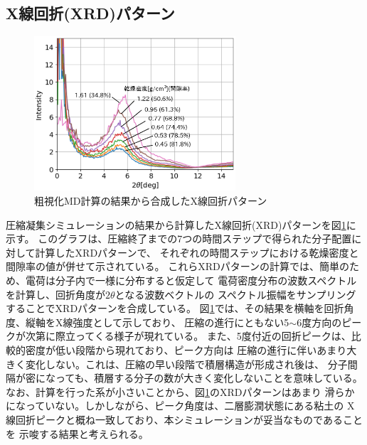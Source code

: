 ﻿\documentclass[11pt,a4j]{jarticle}
\begin{document}
\subsection{X線回折(XRD)パターン}
\begin{figure}
	\centering
	\includegraphics[keepaspectratio,width=75mm]{Figs/xrd.eps}
	\caption{粗視化MD計算の結果から合成したX線回折パターン}
	\label{fig:fig3}
\end{figure}
圧縮凝集シミュレーションの結果から計算したX線回折(XRD)パターンを図\ref{fig:fig3}に示す。
このグラフは、圧縮終了までの7つの時間ステップで得られた分子配置に対して計算したXRDパターンで、
それぞれの時間ステップにおける乾燥密度と間隙率の値が併せて示されている。
これらXRDパターンの計算では、簡単のため、電荷は分子内で一様に分布すると仮定して
電荷密度分布の波数スペクトルを計算し、回折角度が$2\theta$となる波数ベクトルの
スペクトル振幅をサンプリングすることでXRDパターンを合成している。
図\ref{fig:fig3}では、その結果を横軸を回折角度、縦軸をX線強度として示しており、
圧縮の進行にともない5$\sim$6度方向のピークが次第に際立ってくる様子が現れている。
また、5度付近の回折ピークは、比較的密度が低い段階から現れており、ピーク方向は
圧縮の進行に伴いあまり大きく変化しない。これは、圧縮の早い段階で積層構造が形成され後は、
分子間隔が密になっても、積層する分子の数が大きく変化しないことを意味している。
なお、計算を行った系が小さいことから、図\ref{fig:fig3}のXRDパターンはあまり
滑らかになっていない。しかしながら、ピーク角度は、二層膨潤状態にある粘土の
X線回折ピークと概ね一致しており、本シミュレーションが妥当なものであることを
示唆する結果と考えられる。
\end{document}
